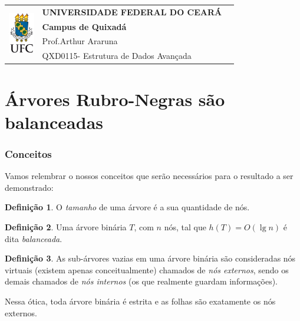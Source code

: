 \documentclass[11pt,twoside]{article}
\theoremstyle{definition}
\newtheorem{definition}{Definição}[section]
\def\disciplinacodigotext{QXD0115}
\def\disciplinanometext{Estrutura de Dados Avançada}
\def\provatitle{Árvores Rubro-Negras são balanceadas}
\def\professorabbrv{Prof.}
\def\professornometext{Arthur Araruna}
\begin{document}
\noindent
\begin{minipage}{\textwidth}
	\begin{tabularx}{\textwidth}{cXc}
		\multirow{4}{*}{\includegraphics[height=1.8cm]{../brasaoufc.pdf}} & {\bf UNIVERSIDADE FEDERAL DO CEARÁ}         & \multirow{3}{*}{} \\
		                                                                  & {\bf Campus de Quixadá}                     &                   \\
		                                                                  & \professorabbrv\enspace\professornometext   &                   \\
		                                                                  & \disciplinacodigotext - \disciplinanometext & {}                \\
	\end{tabularx}
\end{minipage}

\part*{\provatitle}

\section{Conceitos}

Vamos relembrar o nossos conceitos que serão necessários para o resultado a ser demonstrado:

\begin{definition}
	O \emph{tamanho} de uma árvore é a sua quantidade de nós.
\end{definition}

\begin{definition}
	Uma árvore binária \( T \), com \( n \) nós, tal que \( h(T) = O(\lg n) \) é dita \emph{balanceada}.
\end{definition}

\begin{definition}
	As sub-árvores vazias em uma árvore binária são consideradas nós virtuais (existem apenas conceitualmente) chamados de \emph{nós externos}, sendo os demais chamados de \emph{nós internos} (os que realmente guardam informações).

	Nessa ótica, toda árvore binária é estrita e as folhas são exatamente os nós externos.
\end{definition}
\end{document}
